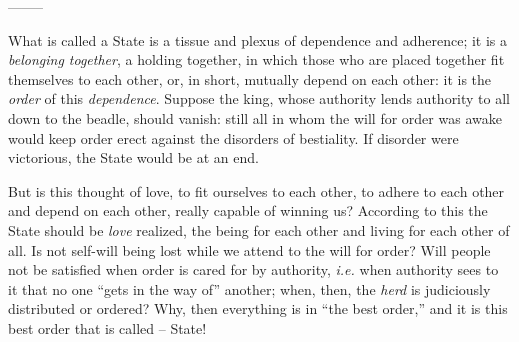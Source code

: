 \documentclass[12pt,a4paper]{book}
\begin{document}
\begin{center}
--------\end{center}


What is called a State is a tissue and plexus of dependence and adherence; it 
is a \textit{belonging together}, a holding together, in which those who are 
placed together fit themselves to each other, or, in short, mutually depend on 
each other: it is the \textit{order} of this \textit{dependence}. Suppose the 
king, whose authority lends authority to all down to the beadle, should 
vanish: still all in whom the will for order was awake would keep order erect 
against the disorders of bestiality. If disorder were victorious, the State 
would be at an end.

But is this thought of love, to fit ourselves to each other, to adhere to each 
other and depend on each other, really capable of winning us? According to 
this the State should be \textit{love} realized, the being for each other and 
living for each other of all. Is not self-will being lost while we attend to 
the will for order? Will people not be satisfied when order is cared for by 
authority, \textit{i.e.} when authority sees to it that no one ``gets in the 
way of'' another; when, then, the \textit{herd} is judiciously distributed or 
ordered? Why, then everything is in ``the best order,'' and it is this best 
order that is called -- State!
\end{document}

